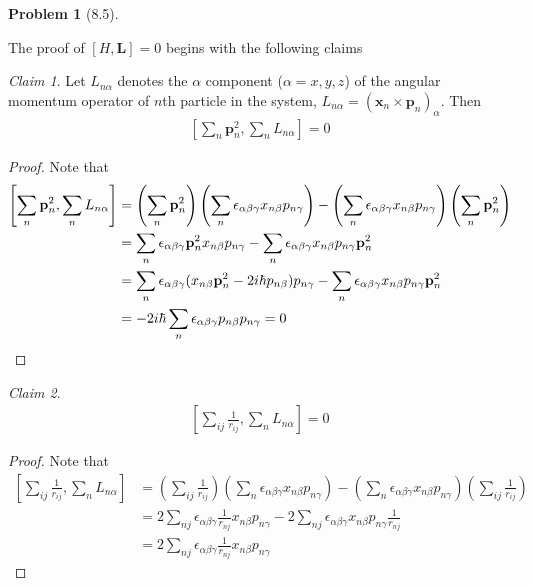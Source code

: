 \documentclass[twoside,11pt]{article}
\theoremstyle{definition}
\newtheorem{problem}{Problem}
\theoremstyle{remark}
\newtheorem*{claim}{Claim}
\begin{document}
\begin{problem}[8.5]
\begin{enumerate}[label=(\alph*)]
The proof of $[H,\mathbf{L}]=0$ begins with the following claims
\begin{claim}
Let $L_{n\alpha}$ denotes the $\alpha$ component ($\alpha=x,y,z$)
of the angular momentum operator of $n$th particle in the system,
$L_{n\alpha} = (\mathbf{x}_n\times\mathbf{p}_n)_\alpha$.
Then
\begin{align*}
    \left[
        \sum_n \mathbf{p}_n^2,
        \sum_n L_{n\alpha}
    \right] = 0
\end{align*}
\end{claim}
\begin{proof}
    Note that
    \begin{align*}
        \left[
        \sum_n \mathbf{p}_n^2,
        \sum_n L_{n\alpha}
    \right] &=
    \left(\sum_n\mathbf{p}_n^2\right)
    \left(\sum_n \epsilon_{\alpha\beta\gamma}x_{n\beta}p_{n\gamma}\right)
    -\left(\sum_n \epsilon_{\alpha\beta\gamma}x_{n\beta}p_{n\gamma}\right)
    \left(\sum_n\mathbf{p}_n^2\right)\\
    &= \sum_n\epsilon_{\alpha\beta\gamma} \mathbf{p}_n^2x_{n\beta}p_{n\gamma}
    -\sum_n\epsilon_{\alpha\beta\gamma}x_{n\beta}p_{n\gamma}\mathbf{p}_n^2\\
    &= \sum_n\epsilon_{\alpha\beta\gamma} (x_{n\beta}\mathbf{p}_n^2 - 2i\hbar p_{n\beta})p_{n\gamma}
    -\sum_n\epsilon_{\alpha\beta\gamma}x_{n\beta}p_{n\gamma}\mathbf{p}_n^2\\
    &= -2i\hbar\sum_n\epsilon_{\alpha\beta\gamma}p_{n\beta}p_{n\gamma} = 0\qedhere
    \end{align*}
\end{proof}
\begin{claim}
\begin{align*}
    \left[\sum_{ij}\frac{1}{r_{ij}}, \sum_n L_{n\alpha}\right] = 0
\end{align*}
\end{claim}
\begin{proof}
Note that
\begin{align*}    
    \left[\sum_{ij}\frac{1}{r_{ij}}, \sum_n L_{n\alpha}\right] &=
    \left(\sum_{ij}\frac{1}{r_{ij}}\right)
    \left(\sum_n\epsilon_{\alpha\beta\gamma}x_{n\beta}p_{n\gamma}\right)
    -\left(\sum_n\epsilon_{\alpha\beta\gamma}x_{n\beta}p_{n\gamma}\right)
    \left(\sum_{ij}\frac{1}{r_{ij}}\right)\\
    &= 2\sum_{nj}\epsilon_{\alpha\beta\gamma}\frac{1}{r_{nj}}x_{n\beta}p_{n\gamma}
    - 2\sum_{nj}\epsilon_{\alpha\beta\gamma}x_{n\beta}p_{n\gamma}\frac{1}{r_{nj}}\\
    &= 2\sum_{nj}\epsilon_{\alpha\beta\gamma}\frac{1}{r_{nj}}x_{n\beta}p_{n\gamma}

\end{align*}
\end{proof}
\end{enumerate}
\end{problem}
\end{document}
